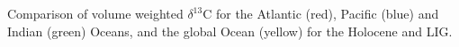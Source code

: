 Comparison of volume weighted $\delta^{13}$C for the Atlantic (red), Pacific (blue) and Indian (green) Oceans, and the global Ocean (yellow) for the Holocene and LIG.